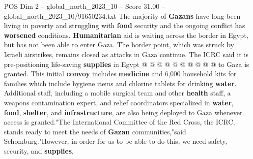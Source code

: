 \begin{textsample}{POS Dim 2 – global\_north\_2023\_10 – Score 31.00 – global\_north\_2023\_10/91650234.txt}
The majority of \textbf{Gazans} have long been living in poverty and struggling with \textbf{food} security and the ongoing conflict has \textbf{worsened} conditions. \textbf{Humanitarian} aid is waiting across the border in Egypt, but has not been able to enter Gaza.
The border point, which was struck by Israeli airstrikes, remains closed as attacks in Gaza continue.
The ICRC said it is pre-positioning life-saving \textbf{supplies} in Egypt @ @ @ @ @ @ @ @ @ @ to Gaza is granted.
This initial \textbf{convoy} includes \textbf{medicine} and 6,000 household kits for families which include hygiene items and chlorine tablets for drinking \textbf{water}.
Additional staff, including a mobile surgical team and other \textbf{health} staff, a weapons contamination expert, and relief coordinators specialized in \textbf{water}, \textbf{food}, \textbf{shelter}, and \textbf{infrastructure}, are also being deployed to Gaza whenever access is granted."The International Committee of the Red Cross, the ICRC, stands ready to meet the needs of \textbf{Gazan} communities,"said Schomburg."However, in order for us to be able to do this, we need safety, security, and \textbf{supplies},

\end{textsample}
